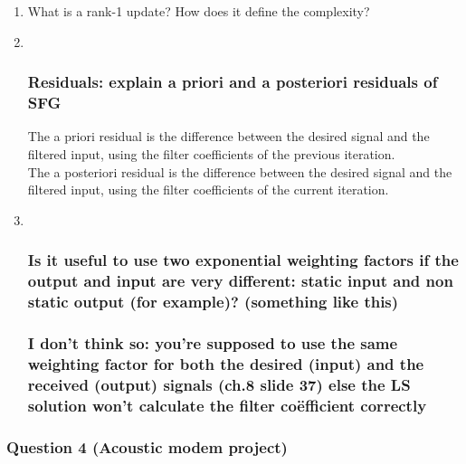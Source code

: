 \documentclass[
  a4paper,
  ,captions=tableheading
]{scrartcl}
\begin{document}
\begin{enumerate}
\def\labelenumi{\arabic{enumi}.}
\item
  What is a rank-1 update? How does it define the complexity?
\item ~
  \subsubsection{Residuals: explain a priori and a posteriori residuals
  of
  SFG}\label{residuals-explain-a-priori-and-a-posteriori-residuals-of-sfg}

  The a priori residual is the difference between the desired signal and
  the filtered input, using the filter coefficients of the previous
  iteration.\\
  The a posteriori residual is the difference between the desired signal
  and the filtered input, using the filter coefficients of the current
  iteration.
\item ~
  \subsubsection{Is it useful to use two exponential weighting factors
  if the output and input are very different: static input and non
  static output (for example)? (something like
  this)}\label{is-it-useful-to-use-two-exponential-weighting-factors-if-the-output-and-input-are-very-different-static-input-and-non-static-output-for-example-something-like-this}

  \subsubsection{I don't think so: you're supposed to use the same
  weighting factor for both the desired (input) and the received
  (output) signals (ch.8 slide 37) else the LS solution won't calculate
  the filter coëfficient
  correctly}\label{i-dont-think-so-youre-supposed-to-use-the-same-weighting-factor-for-both-the-desired-input-and-the-received-output-signals-ch.8-slide-37-else-the-ls-solution-wont-calculate-the-filter-couxebfficient-correctly}
\end{enumerate}

\subsubsection{Question 4 (Acoustic modem
project)}\label{question-4-acoustic-modem-project-1}
\end{document}
